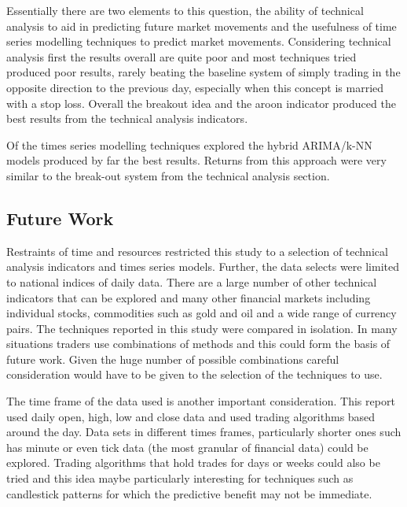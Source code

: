 Essentially there are two elements to this question, the ability of technical analysis to aid in predicting future market movements and the usefulness of time series modelling techniques to predict market movements. Considering technical analysis first the results overall are quite poor and most techniques tried produced poor results, rarely beating the baseline system of simply trading in the opposite direction to the previous day, especially when this concept is married with a stop loss. Overall the breakout idea and the aroon indicator produced the best results from the technical analysis indicators.

Of the times series modelling techniques explored the hybrid ARIMA/k-NN models produced by far the best results. Returns from this approach were very similar to the break-out system from the technical analysis section.

\subsection{Future Work}
Restraints of time and resources restricted this study to a selection of technical analysis indicators and times series models. Further, the data selects were limited to national indices of daily data. There are a large number of other technical indicators that can be explored and many other financial markets including individual stocks, commodities such as gold and oil and a wide range of currency pairs. The techniques reported in this study were compared in isolation. In many situations traders use combinations of methods and this could form the basis of future work. Given the huge number of possible combinations careful consideration would have to be given to the selection of the techniques to use.

The time frame of the data used is another important consideration. This report used daily open, high, low and close data and used trading algorithms based around the day. Data sets in different times frames, particularly shorter ones such has minute or even tick data (the most granular of financial data) could be explored. Trading algorithms that hold trades for days or weeks could also be tried and this idea maybe particularly interesting for techniques such as candlestick patterns for which the predictive benefit may not be immediate.
